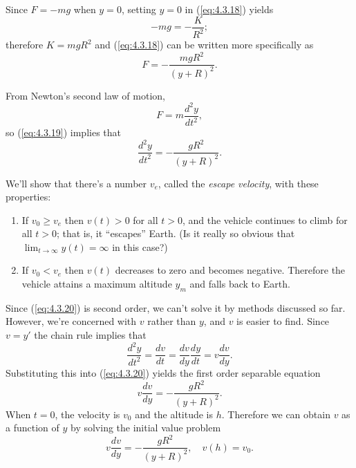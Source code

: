 \documentclass{ximera}
\begin{document}
 
 Since $F=-mg$ when $y=0$, setting $y=0$ in
(\ref{eq:4.3.18}) yields
$$
-mg=-\frac{K}{R^2};
$$
 therefore $K=mgR^2$ and (\ref{eq:4.3.18}) can be written more
specifically as
\begin{equation} \label{eq:4.3.19}
F=-\frac{mgR^2}{(y+R)^2}.
\end{equation}
 
From Newton's second law of motion,
$$
F=m\frac{d^2y}{dt^2},
$$
so (\ref{eq:4.3.19}) implies that
\begin{equation} \label{eq:4.3.20}
\frac{d^2y}{dt^2}=-\frac{gR^2}{(y+R)^2}.
\end{equation}
 
We'll show that there's a number $v_e$, called the \textit{escape
velocity}, with these properties:
 
\begin{enumerate}
\item If $v_0\geq v_e$ then $v(t)>0$ for all $t>0$, and the vehicle
continues to climb for all $t>0$; that is, it ``escapes'' Earth.
(Is it really so obvious that $\lim_{t\rightarrow\infty}y(t)=\infty$
in this case?)
\item  If $v_0<v_e$  then  $v(t)$   decreases to zero and becomes negative.
Therefore
 the vehicle attains a  maximum
altitude  $y_m$ and
falls back to Earth.
 \end{enumerate}
 
Since
(\ref{eq:4.3.20}) is second order, we can't solve it by methods discussed
so far. However, we're concerned with $v$ rather than $y$, and $v$ is
easier to find. Since $v=y'$ the chain rule implies that
$$
\frac{d^2y}{dt^2}=\frac{dv}{dt}=\frac{dv}{dy}\frac{dy}{dt}=v\frac{dv}{dy}.
$$
 Substituting this into (\ref{eq:4.3.20}) yields the first order
separable equation
\begin{equation} \label{eq:4.3.21}
v\frac{dv}{dy}=-\frac{gR^2}{(y+R)^2}.
\end{equation}
When $t=0$, the velocity is $v_0$ and the altitude is $h$. Therefore
we can
obtain $v$ as a function of $y$ by solving the initial value problem
$$
v\frac{dv}{dy}=-\frac{gR^2}{(y+R)^2},\quad  v(h)=v_0.
$$
 
\end{document}
